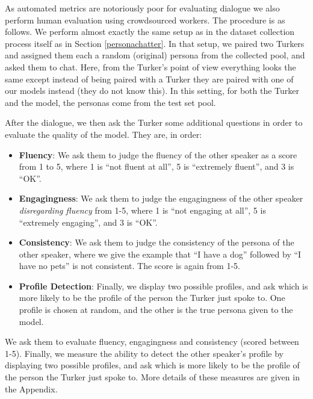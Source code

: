 As automated metrics are notoriously poor for evaluating dialogue \citep{liu2016not} we also perform human evaluation using crowdsourced workers.
The procedure is as follows. We perform almost exactly the same setup as in the dataset collection process itself as in Section \ref{personachatter}. In that setup,  we paired two Turkers and assigned them each a random (original) persona from the collected pool, and asked them to chat. Here, from the Turker's point of view everything looks the same except instead of being paired with a Turker they are paired with one of our models instead (they do not know this). In this setting, for both the Turker and the model, the personas come from the test set pool.

After the dialogue, we then ask the Turker some additional questions in order to evaluate the quality of the model. 
\ifarxiv
They are, in order:
\begin{itemize}

\item {\bf Fluency}: We ask them to judge the fluency of the other speaker as a score from 1 to 5, where 1 is ``not fluent at all'', 5 is ``extremely fluent'', and 3 is ``OK''. 

\item {\bf Engagingness}: We ask them to judge the engagingness of the other speaker {\em disregarding fluency} from 1-5, where 1 is ``not engaging at all'', 5 is ``extremely engaging'', and 3 is ``OK''.

\item {\bf Consistency}: We ask them to judge the consistency of the persona of the other speaker, where we give the example that ``I have a dog''  followed by ``I have no pets'' is not consistent. The score is again from 1-5.

\item {\bf Profile Detection}: Finally, we display two possible profiles, and ask which is more likely to be the profile of the person the Turker just spoke to. One profile is chosen at random, and the other is the true persona given to the model.
\end{itemize}
\else
We ask them to evaluate fluency, engagingness and consistency (scored between 1-5). Finally, we measure the ability to detect the other speaker's profile by displaying two possible profiles, and ask which is more likely to be the profile of the person the Turker just spoke to.  More details of these measures are given in the Appendix.
\fi



